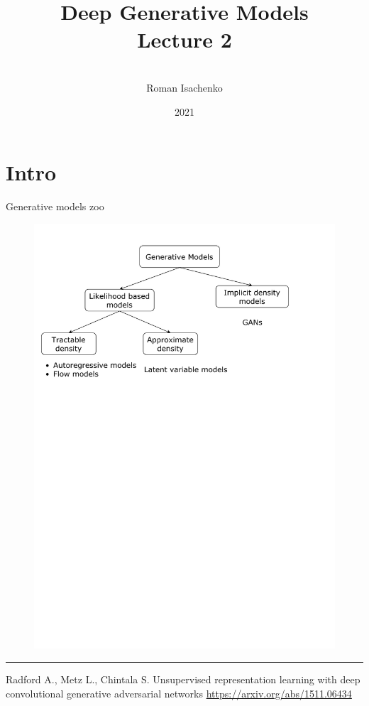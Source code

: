 \documentclass{beamer}
\title[\hbox to 56mm{Deep Generative Models  \hfill\insertframenumber\,/\,\inserttotalframenumber}]
{Deep Generative Models \\ Lecture 2}
\author[Roman Isachenko]{\\Roman Isachenko}
\institute[Ozon]{Ozon Masters \\
}
\date{2021}
\begin{document}
\begin{frame}
\titlepage
\end{frame}
\section{Intro}
\begin{frame}{Generative models zoo}
    \begin{figure}
        \centering
        \includegraphics[width=1.0\linewidth]{figs/generative_models_zoo.pdf}
        \label{fig:generative_models_zoo}
    \end{figure}
\vfill
\hrule\medskip
{\scriptsize Radford A., Metz L., Chintala S. Unsupervised representation learning with deep convolutional generative adversarial networks  \href{https://arxiv.org/abs/1511.06434}{https://arxiv.org/abs/1511.06434}}
\end{frame}
\end{document}
